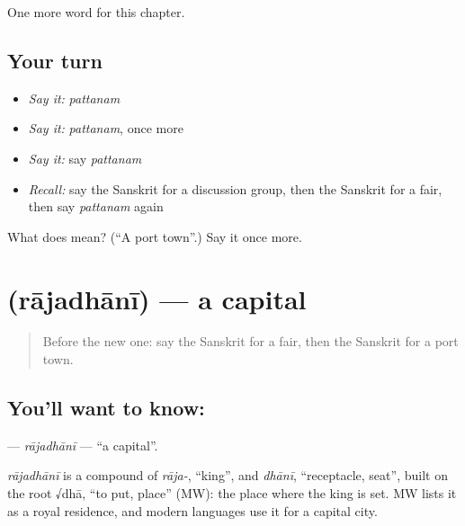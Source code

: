 \begin{grammarlens}[title={What you've built}]
One more word for this chapter.
\end{grammarlens}

\subsection*{Your turn}
\begin{itemize}
\raggedright
  \item \emph{Say it:} \emph{pattanam}
  \item \emph{Say it:} \emph{pattanam}, once more
  \item \emph{Say it:} say \emph{pattanam}
  \item \emph{Recall:} say the Sanskrit for a discussion group, then the Sanskrit for a fair, then say \emph{pattanam} again
\end{itemize}

\begin{tcolorbox}[breakable,colback=teal!4,colframe=teal!35!black,title={Before you move on}]
What does  mean? (\textquotedblleft{}A port town\textquotedblright{}.) Say it once more.
\end{tcolorbox}
\section[\texorpdfstring{\sk{राजधानी} (rājadhānī)}{राजधानी (rājadhānī)}]{ (rājadhānī) — a capital}

\label{lesson:SA-C195-rajadhani}



\begin{quote}
Before the new one: say the Sanskrit for a fair, then the Sanskrit for a port town.
\end{quote}

\subsection*{You'll want to know: }
\textbf{} — \emph{rājadhānī} — \textquotedblleft{}a capital\textquotedblright{}.

\begin{cousinweb}
\emph{rājadhānī} is a compound of \emph{rāja-}, \textquotedblleft{}king\textquotedblright{}, and \emph{dhānī}, \textquotedblleft{}receptacle, seat\textquotedblright{}, built on the root √dhā, \textquotedblleft{}to put, place\textquotedblright{} (MW): the place where the king is set. MW lists it as a royal residence, and modern languages use it for a capital city.
\end{cousinweb}

